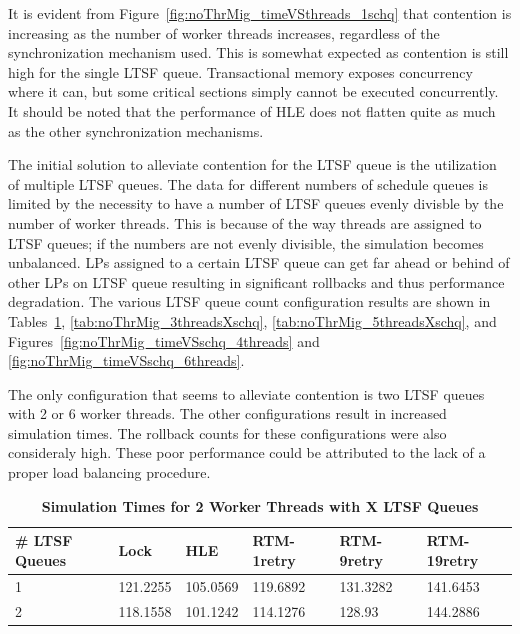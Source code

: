 \documentclass[11pt]{book}
\begin{document}
It is evident from Figure~\ref{fig:noThrMig_timeVSthreads_1schq} that contention is
increasing as the number of worker threads increases, regardless of the synchronization
mechanism used.  This is somewhat expected as contention is still high for the single LTSF
queue.  Transactional memory exposes concurrency where it can, but some critical sections
simply cannot be executed concurrently.  It should be noted that the performance of HLE
does not flatten quite as much as the other synchronization mechanisms.

The initial solution to alleviate contention for the LTSF queue is the utilization of
multiple LTSF queues.  The data for different numbers of schedule queues is limited by the
necessity to have a number of LTSF queues evenly divisble by the number of worker threads.
This is because of the way threads are assigned to LTSF queues; if the numbers are not
evenly divisible, the simulation becomes unbalanced.  LPs assigned to a certain LTSF queue
can get far ahead or behind of other LPs on LTSF queue resulting in significant rollbacks
and thus performance degradation.  The various LTSF queue count configuration results are
shown in Tables~\ref{tab:noThrMig_2threadsXschq}, \ref{tab:noThrMig_3threadsXschq},
\ref{tab:noThrMig_5threadsXschq}, and Figures~\ref{fig:noThrMig_timeVSschq_4threads} and
\ref{fig:noThrMig_timeVSschq_6threads}.

The only configuration that seems to alleviate contention is two LTSF queues with 2 or 6
worker threads.  The other configurations result in increased simulation times.  The
rollback counts for these configurations were also consideraly high.  These poor
performance could be attributed to the lack of a proper load balancing procedure.

\begin{table}
    \centering
    \begin{tabular}{l|p{2cm}|p{2cm}|p{2cm}|p{2cm}|p{2cm}}
        \textbf{\# LTSF Queues}&Lock &HLE &RTM-1retry &RTM-9retry &RTM-19retry \\
        \hline
        \midrule
            1 &121.2255  &105.0569 &119.6892 &131.3282 &141.6453 \\ 
            2 &118.1558  &101.1242 &114.1276 &128.93   &144.2886 \\
    \end{tabular}
    \caption{\textbf{Simulation Times for 2 Worker Threads with X LTSF Queues}}
    \label{tab:noThrMig_2threadsXschq}
\end{table}
\end{document}
